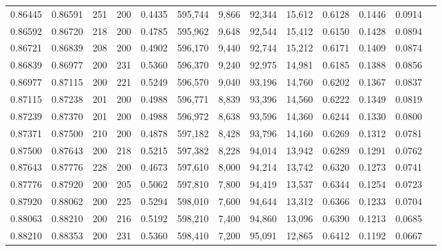 \begin{tabular}{rrrrrrrrrrrrr}
0.86445 & 0.86591 &    251 & 200 &                                     0.4435 & 595,744 &   9,866 &  92,344 &  15,612 & 0.6128 & 0.1446 & 0.0914 \\
0.86592 & 0.86720 &    218 & 200 &                                     0.4785 & 595,962 &   9,648 &  92,544 &  15,412 & 0.6150 & 0.1428 & 0.0894 \\
0.86721 & 0.86839 &    208 & 200 &                                     0.4902 & 596,170 &   9,440 &  92,744 &  15,212 & 0.6171 & 0.1409 & 0.0874 \\
0.86839 & 0.86977 &    200 & 231 &                                     0.5360 & 596,370 &   9,240 &  92,975 &  14,981 & 0.6185 & 0.1388 & 0.0856 \\
0.86977 & 0.87115 &    200 & 221 &                                     0.5249 & 596,570 &   9,040 &  93,196 &  14,760 & 0.6202 & 0.1367 & 0.0837 \\
0.87115 & 0.87238 &    201 & 200 &                                     0.4988 & 596,771 &   8,839 &  93,396 &  14,560 & 0.6222 & 0.1349 & 0.0819 \\
0.87239 & 0.87370 &    201 & 200 &                                     0.4988 & 596,972 &   8,638 &  93,596 &  14,360 & 0.6244 & 0.1330 & 0.0800 \\
0.87371 & 0.87500 &    210 & 200 &                                     0.4878 & 597,182 &   8,428 &  93,796 &  14,160 & 0.6269 & 0.1312 & 0.0781 \\
0.87500 & 0.87643 &    200 & 218 &                                     0.5215 & 597,382 &   8,228 &  94,014 &  13,942 & 0.6289 & 0.1291 & 0.0762 \\
0.87643 & 0.87776 &    228 & 200 &                                     0.4673 & 597,610 &   8,000 &  94,214 &  13,742 & 0.6320 & 0.1273 & 0.0741 \\
0.87776 & 0.87920 &    200 & 205 &                                     0.5062 & 597,810 &   7,800 &  94,419 &  13,537 & 0.6344 & 0.1254 & 0.0723 \\
0.87920 & 0.88062 &    200 & 225 &                                     0.5294 & 598,010 &   7,600 &  94,644 &  13,312 & 0.6366 & 0.1233 & 0.0704 \\
0.88063 & 0.88210 &    200 & 216 &                                     0.5192 & 598,210 &   7,400 &  94,860 &  13,096 & 0.6390 & 0.1213 & 0.0685 \\
0.88210 & 0.88353 &    200 & 231 &                                     0.5360 & 598,410 &   7,200 &  95,091 &  12,865 & 0.6412 & 0.1192 & 0.0667 \\

\end{tabular}
